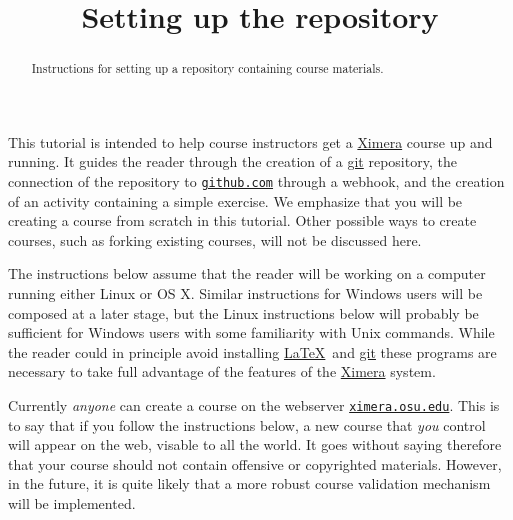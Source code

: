 \documentclass{ximera}
\title{Setting up the repository}
\begin{document}
\begin{abstract}
Instructions for setting up a repository containing course materials.
\end{abstract}
\maketitle

This tutorial is intended to help course instructors get a
\href{http://ximera.osu.edu}{\sf Ximera} 
course up and running. It guides the reader through the creation of a
\href{http://git-scm.com}{\sf git}
repository, the connection of the repository to
\href{http://github.com}{\tt github.com}
through a webhook, and the creation of an activity containing a 
simple exercise. We emphasize that you will be creating
a course from scratch in this tutorial. Other possible ways to create
courses, such as forking existing courses, will
not be discussed here.

The instructions below assume that the reader will be
working on a computer running either Linux or OS X.
Similar instructions for Windows users will be composed
at a later stage, but the Linux instructions below will probably
be sufficient for Windows users with some familiarity with Unix commands.
While the reader could in principle avoid installing 
\href{http://texlive.org}{\LaTeX}\ and
\href{http://git-scm.com}{\sf git} these programs are necessary
to take full advantage of the features of the 
\href{http://ximera.osu.edu}{\sf Ximera} system.

\begin{warning} Currently {\em anyone} can
create a course on the webserver
\href{http://ximera.osu.edu}{\tt ximera.osu.edu}.
This is to say that if you follow the instructions below,
a new course that {\em you} control will appear on the web,
visable to all the world. It goes without saying therefore that
your course should not contain offensive or copyrighted
materials. However, in the future, it is quite likely that a
more robust course validation mechanism will be implemented.
\end{warning}
\end{document}

